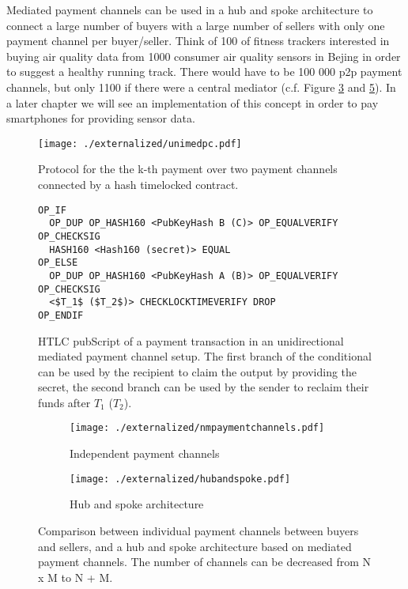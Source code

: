 Mediated payment channels can be used in a hub and spoke architecture to connect a large number of buyers with a large number of sellers with only one payment channel per buyer/seller. Think of 100 of fitness trackers interested in buying air quality data from 1000 consumer air quality sensors in Bejing in order to suggest a healthy running track. There would have to be 100 000 p2p payment channels, but only 1100 if there were a central mediator (c.f. Figure \ref{fig:nmpaymentchannels} and \ref{fig:hubandspoke}). In a later chapter we will see an implementation of this concept in order to pay smartphones for providing sensor data.



\begin{figure}
\centering
\texttt{[image: ./externalized/unimedpc.pdf]}
\caption{Protocol for the the k-th payment over two payment channels connected by a hash timelocked contract.}
\label{fig:unimedpc}
\end{figure}

\begin{figure}
\begin{lstlisting}[breaklines,mathescape=true]
OP_IF
  OP_DUP OP_HASH160 <PubKeyHash B (C)> OP_EQUALVERIFY OP_CHECKSIG
  HASH160 <Hash160 (secret)> EQUAL
OP_ELSE
  OP_DUP OP_HASH160 <PubKeyHash A (B)> OP_EQUALVERIFY OP_CHECKSIG
  <$T_1$ ($T_2$)> CHECKLOCKTIMEVERIFY DROP
OP_ENDIF
\end{lstlisting} 
\caption{HTLC pubScript of a payment transaction in an unidirectional mediated payment channel setup. The first branch of the conditional can be used by the recipient to claim the output by providing the secret, the second branch can be used by the sender to reclaim their funds after $T_1$ ($T_2$).}
\label{fig:pubScriptHTLC}
\end{figure}



\begin{figure}[ht]
  \centering
  \begin{subfigure}[t]{0.5\linewidth}
    \centering\texttt{[image: ./externalized/nmpaymentchannels.pdf]}
    \caption{Independent payment channels\label{fig:nmpaymentchannels}}
  \end{subfigure}%
  \begin{subfigure}[t]{0.5\linewidth}
    \centering\texttt{[image: ./externalized/hubandspoke.pdf]}
    \caption{Hub and spoke architecture\label{fig:hubandspoke}}
  \end{subfigure}
  \caption{Comparison between individual payment channels between buyers and sellers, and a hub and spoke architecture based on mediated payment channels. The number of channels can be decreased from N x M to N + M.}
\end{figure}


